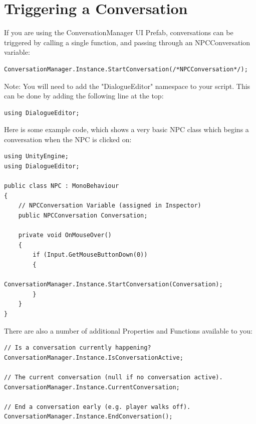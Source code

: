 \documentclass[a4paper,12pt]{article}
\begin{document}
\newpage




\hypertarget{_triggering}{}
\section{Triggering a Conversation}

If you are using the ConversationManager UI Prefab, conversations can be triggered by calling a single function, and passing through an NPCConversation variable:
\bigskip

\begin{lstlisting}
ConversationManager.Instance.StartConversation(/*NPCConversation*/);
\end{lstlisting}
\bigskip

Note: You will need to add the "DialogueEditor" namespace to your script. This can be done by adding the following line at the top:
\bigskip

\begin{lstlisting}
using DialogueEditor;
\end{lstlisting}
\bigskip

Here is some example code, which shows a very basic NPC class which begins a conversation when the NPC is clicked on:
\bigskip

\begin{lstlisting}
using UnityEngine;
using DialogueEditor;

public class NPC : MonoBehaviour
{
	// NPCConversation Variable (assigned in Inspector)
	public NPCConversation Conversation;

	private void OnMouseOver()
	{
		if (Input.GetMouseButtonDown(0))
		{
			ConversationManager.Instance.StartConversation(Conversation);
		}
	}
}
\end{lstlisting}
\bigskip


There are also a number of additional Properties and Functions available to you:
\bigskip

\begin{lstlisting}
// Is a conversation currently happening?
ConversationManager.Instance.IsConversationActive;

// The current conversation (null if no conversation active).
ConversationManager.Instance.CurrentConversation;

// End a conversation early (e.g. player walks off).
ConversationManager.Instance.EndConversation();
\end{lstlisting}
\end{document}
